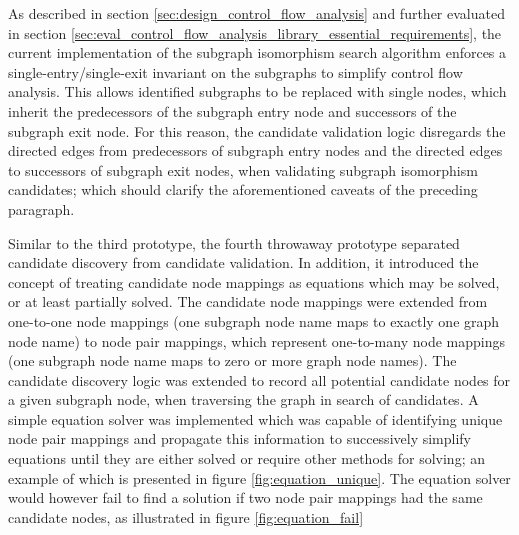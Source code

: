 As described in section \ref{sec:design_control_flow_analysis} and further evaluated in section \ref{sec:eval_control_flow_analysis_library_essential_requirements}, the current implementation of the subgraph isomorphism search algorithm enforces a single-entry/single-exit invariant on the subgraphs to simplify control flow analysis. This allows identified subgraphs to be replaced with single nodes, which inherit the predecessors of the subgraph entry node and successors of the subgraph exit node. For this reason, the candidate validation logic disregards the directed edges from predecessors of subgraph entry nodes and the directed edges to successors of subgraph exit nodes, when validating subgraph isomorphism candidates; which should clarify the aforementioned caveats of the preceding paragraph.

Similar to the third prototype, the fourth throwaway prototype separated candidate discovery from candidate validation. In addition, it introduced the concept of treating candidate node mappings as equations which may be solved, or at least partially solved. The candidate node mappings were extended from one-to-one node mappings (one subgraph node name maps to exactly one graph node name) to node pair mappings, which represent one-to-many node mappings (one subgraph node name maps to zero or more graph node names). The candidate discovery logic was extended to record all potential candidate nodes for a given subgraph node, when traversing the graph in search of candidates. A simple equation solver was implemented which was capable of identifying unique node pair mappings and propagate this information to successively simplify equations until they are either solved or require other methods for solving; an example of which is presented in figure \ref{fig:equation_unique}. The equation solver would however fail to find a solution if two node pair mappings had the same candidate nodes, as illustrated in figure \ref{fig:equation_fail}

